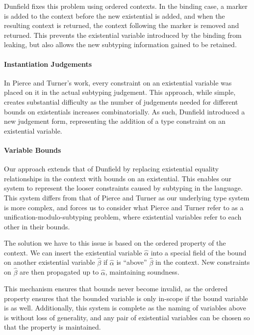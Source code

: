 \documentclass{llncs}
\begin{document}
Dunfield fixes this problem using ordered contexts. In the binding case, a marker is added to the context before the new existential is added, and when the resulting context is returned, the context following the marker is removed and returned. This prevents the existential variable introduced by the binding from leaking, but also allows the new subtyping information gained to be retained.

\paragraph{Instantiation Judgements}
In Pierce and Turner's work, every constraint on an existential variable was placed on it in the actual subtyping judgement. This approach, while simple, creates substantial difficulty as the number of judgements needed for different bounds on existentials increases combinatorially. As such, Dunfield introduced a new judgement form, representing the addition of a type constraint on an existential variable.

\paragraph{Variable Bounds}
Our approach extends that of Dunfield by replacing existential equality relationships in the context with bounds on an existential. This enables our system to represent the looser constraints caused by subtyping in the language. This system differs from that of Pierce and Turner as our underlying type system is more complex, and forces us to consider what Pierce and Turner refer to as a unification-modulo-subtyping problem, where existential variables refer to each other in their bounds.

The solution we have to this issue is based on the ordered property of the context. We can insert the existential variable $\hat{\alpha}$ into a special field of the bound on another existential variable $\hat{\beta}$ if $\hat{\alpha}$ is ``above'' $\hat{\beta}$ in the context. New constraints on $\hat{\beta}$ are then propagated up to $\hat{\alpha}$, maintaining soundness.

This mechanism ensures that bounds never become invalid, as the ordered property ensures that the bounded variable is only in-scope if the bound variable is as well. Additionally, this system is complete as the naming of variables above is without loss of generality, and any pair of existential variables can be chosen so that the property is maintained.
\end{document}
